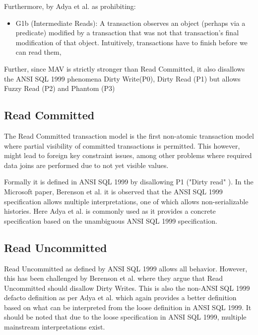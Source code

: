 \documentclass[a4paper,10pt,titlepage]{report}
\begin{document}
Furthermore, by Adya et al. \cite{Adya99weakconsistency} as prohibiting:
\begin{itemize}
    \item G1b (Intermediate Reads): A transaction observes an object (perhaps via a predicate) modified by a transaction that was not that transaction's final modification of that object. Intuitively, transactions have to finish before we can read them,
\end{itemize}

Further, since MAV is strictly stronger than Read Committed, it also disallows the ANSI SQL 1999\cite{ansisql1999} phenomena Dirty Write(P0), Dirty Read (P1) but allows Fuzzy Read (P2) and Phantom (P3)

\subsection{Read Committed}
The Read Committed transaction model is the first non-atomic transaction model where partial visibility of committed transactions is permitted. This however, might lead to foreign key constraint issues, among other problems where required data joins are performed due to not yet visible values.
\\ \vspace{5mm}

Formally it is defined in ANSI SQL 1999\cite{ansisql1999} by disallowing P1 ("Dirty read" ). In the Microsoft paper, Berenson et al. \cite{Berensonetal} it is observed that the ANSI SQL 1999\cite{ansisql1999} specification allows multiple interpretations, one of which allows non-serializable histories. Here Adya et al.\cite{Adya99weakconsistency} is commonly used as it provides a concrete specification based on the unambiguous ANSI SQL 1999\cite{ansisql1999} specification.
\\ \vspace{5mm}


\subsection{Read Uncommitted}
Read Uncommitted as defined by ANSI SQL 1999\cite{ansisql1999} allows all behavior. However, this has been challenged by Berenson et al. \cite{Berensonetal} where they argue that Read Uncommitted should disallow Dirty Writes. This is also the non-ANSI SQL 1999\cite{ansisql1999} defacto definition as per Adya et al. \cite{Adya99weakconsistency} which again provides a better definition based on what can be interpreted from the loose definition in ANSI SQL 1999\cite{ansisql1999}. It should be noted that due to the loose specification in ANSI SQL 1999\cite{ansisql1999}, multiple mainstream interpretations exist.\\
\end{document}
